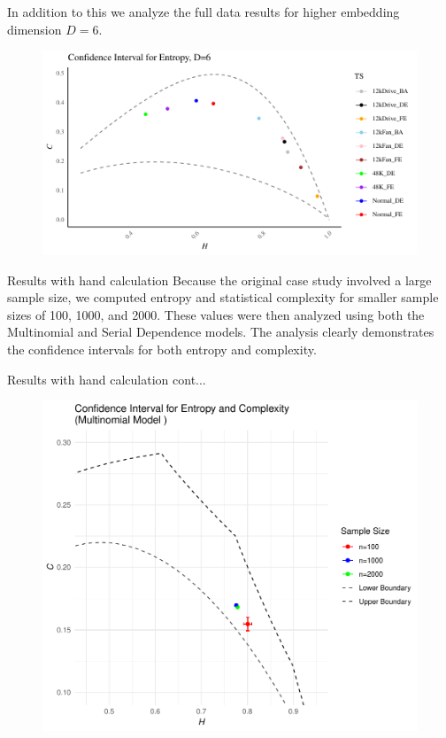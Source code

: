 \documentclass{beamer}
\begin{document}
\begin{frame}
	In addition to this we analyze the full data results for higher embedding dimension $D=6$.
		\begin{figure}[hbt]
		\centering
		\includegraphics[width=0.8 \textwidth]{Confidence Interval}
		\label{fig:EntopyComplexity Plane D=6}
	\end{figure}
\end{frame}

\begin{frame}{Results with hand calculation}
Because the original case study involved a large sample size, we computed entropy and statistical complexity for smaller sample sizes of 100, 1000, and 2000. These values were then analyzed using both the Multinomial and Serial Dependence models. The analysis clearly demonstrates the confidence intervals for both entropy and complexity.	
\end{frame}

\begin{frame}{Results with hand calculation cont...}
	\begin{figure}[hbt]
		\centering
		\includegraphics[width=0.7 \textwidth]{CI for Multinomial model}
	\end{figure}
\end{frame}
\end{document}
